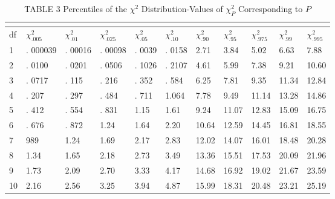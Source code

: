 \documentclass{article}%
\newif\ifwithrefs
\begin{document}
\begin{table}[H]
\captionsetup{labelformat=empty}
\caption{TABLE 3 Percentiles of the $\chi^2$ Distribution-Values of $\chi_P^2$ Corresponding to $P$}
\begin{tabular}{|l|l|l|l|l|l|l|l|l|l|l|}
\hline \multicolumn{11}{|c|}{} \\
\hline df & $\chi_{.005}^2$ & $\chi_{.01}^2$ & $\chi_{.025}^2$ & $\chi_{.05}^2$ & $\chi_{.10}^2$ & $\chi_{.90}^2$ & $\chi_{.95}^2$ & $\chi_{.975}^2$ & $\chi_{.99}^2$ & $\chi_{.995}^2$ \\
\hline 1 & . 000039 & . 00016 & . 00098 & . 0039 & . 0158 & 2.71 & 3.84 & 5.02 & 6.63 & 7.88 \\
\hline 2 & . 0100 & . 0201 & . 0506 & . 1026 & . 2107 & 4.61 & 5.99 & 7.38 & 9.21 & 10.60 \\
\hline 3 & . 0717 & . 115 & . 216 & . 352 & . 584 & 6.25 & 7.81 & 9.35 & 11.34 & 12.84 \\
\hline 4 & . 207 & . 297 & . 484 & . 711 & 1.064 & 7.78 & 9.49 & 11.14 & 13.28 & 14.86 \\
\hline 5 & . 412 & . 554 & . 831 & 1.15 & 1.61 & 9.24 & 11.07 & 12.83 & 15.09 & 16.75 \\
\hline 6 & . 676 & . 872 & 1.24 & 1.64 & 2.20 & 10.64 & 12.59 & 14.45 & 16.81 & 18.55 \\
\hline 7 & 989 & 1.24 & 1.69 & 2.17 & 2.83 & 12.02 & 14.07 & 16.01 & 18.48 & 20.28 \\
\hline 8 & 1.34 & 1.65 & 2.18 & 2.73 & 3.49 & 13.36 & 15.51 & 17.53 & 20.09 & 21.96 \\
\hline 9 & 1.73 & 2.09 & 2.70 & 3.33 & 4.17 & 14.68 & 16.92 & 19.02 & 21.67 & 23.59 \\
\hline 10 & 2.16 & 2.56 & 3.25 & 3.94 & 4.87 & 15.99 & 18.31 & 20.48 & 23.21 & 25.19 \\
\hline
\end{tabular}
\end{table}


\ifwithrefs
  
\fi
\end{document}
